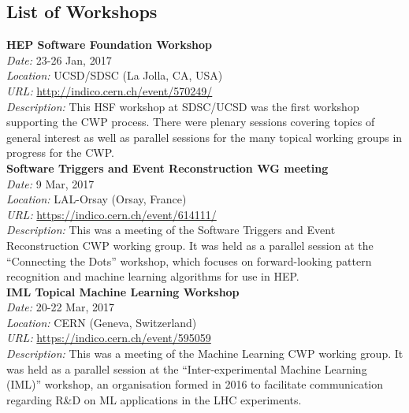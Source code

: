 \documentclass[twocolumn]{svjour3}          %
\begin{document}
\newpage
\begin{appendices}

\hypertarget{appendix-a---list-of-workshops}{%
\section{List of Workshops}\label{appendix-a---list-of-workshops}}

\textbf{HEP Software Foundation Workshop}\\
\emph{Date:} 23-26 Jan, 2017\\
\emph{Location:} UCSD/SDSC (La Jolla, CA, USA)\\
\emph{URL:}
\href{http://indico.cern.ch/event/570249/}{{http://indico.cern.ch/event/570249/}}\\
\emph{Description:} This HSF workshop at SDSC/UCSD was the first
workshop supporting the CWP process. There were plenary sessions
covering topics of general interest as well as parallel sessions for the
many topical working groups in progress for the CWP.\\

\noindent
\textbf{Software Triggers and Event Reconstruction WG meeting}\\
\emph{Date:} 9 Mar, 2017\\
\emph{Location:} LAL-Orsay (Orsay, France)\\
\emph{URL:}
\href{https://indico.cern.ch/event/614111/}{{https://indico.cern.ch/event/614111/}}\\
\emph{Description:} This was a meeting of the Software Triggers and Event
Reconstruction CWP working group. It was held as a parallel session at
the ``Connecting the Dots'' workshop, which focuses on forward-looking
pattern recognition and machine learning algorithms for use in HEP.\\

\noindent
\textbf{IML Topical Machine Learning Workshop}\\
\emph{Date:} 20-22 Mar, 2017\\
\emph{Location:} CERN (Geneva, Switzerland)\\
\emph{URL:}
\href{https://indico.cern.ch/event/595059}{{https://indico.cern.ch/event/595059}}\\
\emph{Description:} This was a meeting of the Machine Learning CWP
working group. It was held as a parallel session at the
``Inter-experimental Machine Learning (IML)'' workshop, an organisation
formed in 2016 to facilitate communication regarding R\&D on ML
applications in the LHC experiments.\\


\end{appendices}
\end{document}
